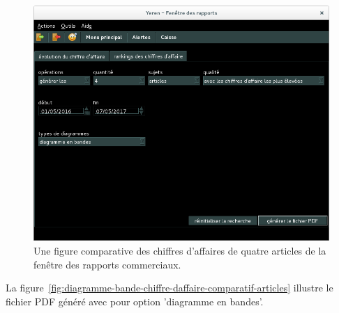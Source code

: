 \begin{figure}[!htbp]
	\centering
	\includegraphics[scale=0.45]{images/yeren-rapports-comparaison-articles.png}
	\caption{Une figure comparative des chiffres d'affaires de
		quatre articles de la fen\^etre des rapports commerciaux.}
	\label{fig:yeroth-tableaux-comparaison-articles}
\end{figure}

La figure~\ref{fig:diagramme-bande-chiffre-daffaire-comparatif-articles}
illustre le fichier PDF g\'en\'er\'e avec pour option 'diagramme en bandes'.


